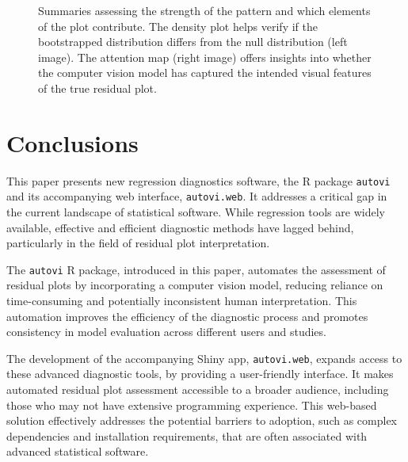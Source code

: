 \documentclass[
doublespace,
  times]{anzsauth}
\begin{document}
\begin{figure}


\caption{\label{fig-autovi-web-distributions}Summaries assessing the
strength of the pattern and which elements of the plot contribute. The
density plot helps verify if the bootstrapped distribution differs from
the null distribution (left image). The attention map (right image)
offers insights into whether the computer vision model has captured the
intended visual features of the true residual plot.}

\end{figure}%

\section{Conclusions}\label{sec-autovi-conclusion}

This paper presents new regression diagnostics software, the R package
\texttt{autovi} and its accompanying web interface, \texttt{autovi.web}.
It addresses a critical gap in the current landscape of statistical
software. While regression tools are widely available, effective and
efficient diagnostic methods have lagged behind, particularly in the
field of residual plot interpretation.

The \texttt{autovi} R package, introduced in this paper, automates the
assessment of residual plots by incorporating a computer vision model,
reducing reliance on time-consuming and potentially inconsistent human
interpretation. This automation improves the efficiency of the
diagnostic process and promotes consistency in model evaluation across
different users and studies.

The development of the accompanying Shiny app, \texttt{autovi.web},
expands access to these advanced diagnostic tools, by providing a
user-friendly interface. It makes automated residual plot assessment
accessible to a broader audience, including those who may not have
extensive programming experience. This web-based solution effectively
addresses the potential barriers to adoption, such as complex
dependencies and installation requirements, that are often associated
with advanced statistical software.
\end{document}
